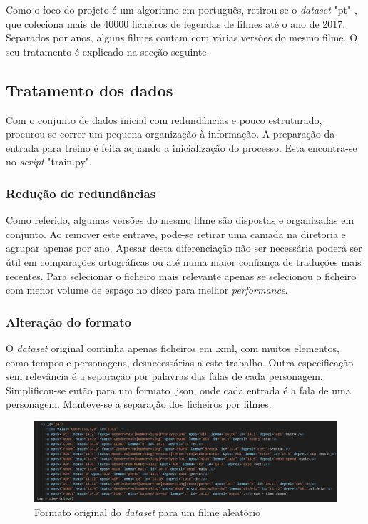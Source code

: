 \documentclass{article}
\begin{document}
Como o foco do projeto é um algoritmo em português, retirou-se o \textit{dataset} "pt" \cite{lison-tiedemann-2016-opensubtitles2016}, que coleciona mais de 40000 ficheiros de legendas de filmes até o ano de 2017. Separados por anos, alguns filmes contam com várias versões do mesmo filme. O seu tratamento é explicado na secção seguinte. 

\subsection{Tratamento dos dados}
Com o conjunto de dados inicial com redundâncias e pouco estruturado, procurou-se correr um pequena organização à informação. A preparação da entrada para treino é feita aquando a inicialização do processo. Esta encontra-se no \textit{script} "train.py".

\subsubsection{Redução de redundâncias}
Como referido, algumas versões do mesmo filme são dispostas e organizadas em conjunto. Ao remover este entrave, pode-se retirar uma camada na diretoria e agrupar apenas por ano. Apesar desta diferenciação não ser necessária poderá ser útil em comparações ortográficas ou até numa maior confiança de traduções mais recentes. Para selecionar o ficheiro mais relevante apenas se selecionou o ficheiro com menor volume de espaço no disco para melhor \textit{performance}.

\subsubsection{Alteração do formato}
O \textit{dataset} original continha apenas ficheiros em .xml, com muitos elementos, como tempos e personagens, desnecessárias a este trabalho. Outra especificação sem relevância é a separação por palavras das falas de cada personagem. Simplificou-se então para um formato .json, onde cada entrada é a fala de uma personagem. Manteve-se a separação dos ficheiros por filmes.

\begin{figure}
	\centering
    \includegraphics[scale=0.3]{xml.png}
    \caption{Formato original do \textit{dataset} para um filme aleatório}
    \label{xmlimg}
\end{figure}
\end{document}
